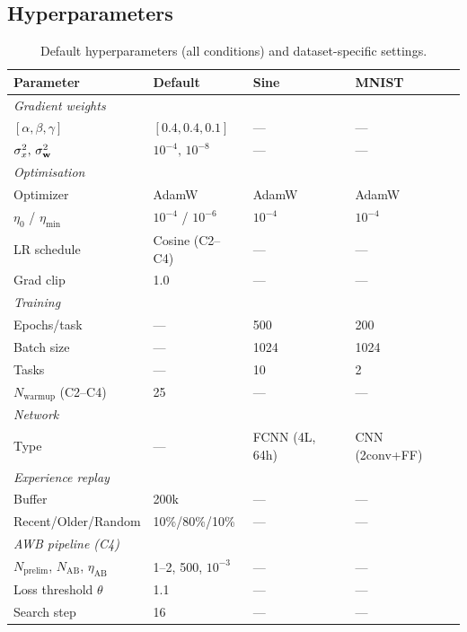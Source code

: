 \subsection{Hyperparameters}
{\tiny
\begin{table}[h]
\centering
\caption{Default hyperparameters (all conditions) and dataset-specific settings.}
\label{tab:hyperparameters}
\setlength{\tabcolsep}{4pt}
\begin{tabular}{@{}llll@{}}
\toprule
\textbf{Parameter} & \textbf{Default} & \textbf{Sine} & \textbf{MNIST} \\
\midrule
\multicolumn{4}{l}{\textit{Gradient weights}} \\
$[\alpha,\beta,\gamma]$ & $[0.4,0.4,0.1]$ & — & — \\
$\sigma_x^2,\,\sigma_{\boldsymbol{\mathrm{w}}}^2$ & $10^{-4},\,10^{-8}$ & — & — \\
\midrule
\multicolumn{4}{l}{\textit{Optimisation}} \\
Optimizer & AdamW & AdamW & AdamW \\
$\eta_0$ / $\eta_{\min}$ & $10^{-4}$ / $10^{-6}$ & $10^{-4}$ & $10^{-4}$ \\
LR schedule & Cosine (C2--C4) & — & — \\
Grad clip & 1.0 & — & — \\
\midrule
\multicolumn{4}{l}{\textit{Training}} \\
Epochs/task & — & 500 & 200 \\
Batch size & — & 1024 & 1024 \\
Tasks & — & 10 & 2 \\
$N_{\text{warmup}}$ (C2--C4) & 25 & — & — \\
\midrule
\multicolumn{4}{l}{\textit{Network}} \\
Type & — & FCNN (4L, 64h) & CNN (2conv+FF) \\
\midrule
\multicolumn{4}{l}{\textit{Experience replay}} \\
Buffer & 200k & — & — \\
Recent/Older/Random & 10\%/80\%/10\% & — & — \\
\midrule
\multicolumn{4}{l}{\textit{AWB pipeline (C4)}} \\
$N_{\text{prelim}}$, $N_{\text{AB}}$, $\eta_{\text{AB}}$ & 1--2, 500, $10^{-3}$ & — & — \\
Loss threshold $\theta$ & 1.1 & — & — \\
Search step & 16 & — & — \\
\bottomrule
\end{tabular}
\end{table}
}

